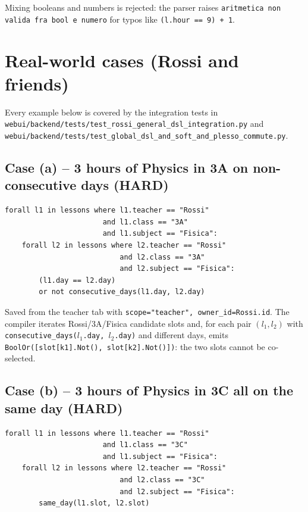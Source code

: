 Mixing booleans and numbers is rejected: the parser raises
\texttt{aritmetica non valida fra bool e numero} for typos
like \texttt{(l.hour == 9) + 1}.

\section{Real-world cases (Rossi and friends)}
\label{sec:dsl-rossi-en}

Every example below is covered by the integration tests in
\texttt{webui/backend/tests/test\_rossi\_general\_dsl\_integration.py}
and
\texttt{webui/backend/tests/test\_global\_dsl\_and\_soft\_and\_plesso\_commute.py}.

\subsection{Case (a) -- 3 hours of Physics in 3A on
non-consecutive days (HARD)}

\begin{lstlisting}
forall l1 in lessons where l1.teacher == "Rossi"
                       and l1.class == "3A"
                       and l1.subject == "Fisica":
    forall l2 in lessons where l2.teacher == "Rossi"
                           and l2.class == "3A"
                           and l2.subject == "Fisica":
        (l1.day == l2.day)
        or not consecutive_days(l1.day, l2.day)
\end{lstlisting}

Saved from the teacher tab with \texttt{scope="teacher",
owner\_id=Rossi.id}. The compiler iterates Rossi/3A/Fisica
candidate slots and, for each pair $(l_1,l_2)$ with
\texttt{consecutive\_days($l_1$.day, $l_2$.day)} and different
days, emits \texttt{BoolOr([slot[k1].Not(),
slot[k2].Not()])}: the two slots cannot be co-selected.

\subsection{Case (b) -- 3 hours of Physics in 3C all on the
same day (HARD)}

\begin{lstlisting}
forall l1 in lessons where l1.teacher == "Rossi"
                       and l1.class == "3C"
                       and l1.subject == "Fisica":
    forall l2 in lessons where l2.teacher == "Rossi"
                           and l2.class == "3C"
                           and l2.subject == "Fisica":
        same_day(l1.slot, l2.slot)
\end{lstlisting}

